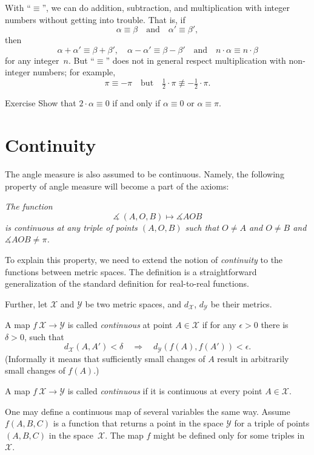 With ``$\equiv$'', we can do addition, subtraction, and multiplication with integer numbers without getting into trouble.
That is, if
$$\alpha\equiv\beta
\quad
\text{and}
\quad
\alpha'\equiv \beta',$$ 
then
$$\alpha+\alpha'\equiv\beta+\beta',
\quad
\alpha-\alpha'\equiv \beta-\beta'
\quad 
\text{and}
\quad
n\cdot\alpha\equiv n\cdot\beta$$
for any integer~$n$.
But ``$\equiv$'' does not in general respect multiplication with non-integer numbers; for example, 
$$\pi
\equiv 
-\pi
\quad
\text{but}
\quad
\tfrac12\cdot\pi
\not\equiv
-\tfrac12\cdot\pi.$$ 

\begin{thm}{Exercise}\label{ex:2a=0}
Show that $2\cdot\alpha\equiv0$ if and only if $\alpha\equiv0$ or $\alpha\equiv\pi$.
\end{thm}

\section*{Continuity}

The angle measure is also assumed to be continuous.
Namely, the following property of angle measure will become a part of the axioms:

\textit{The function}
$$\measuredangle\:(A,O,B)\mapsto\measuredangle A O B$$
\textit{is continuous at any triple of points $(A,O,B)$
such that $O\ne A$ and $O\ne B$ and $\measuredangle A O B\ne\pi$.}

To explain this property, we need to extend the notion of {}\emph{continuity} to the functions between metric spaces.
The definition is a straightforward generalization of the standard definition for real-to-real functions.

Further, let $\mathcal X$ and $\mathcal Y$ be two metric spaces,
and $d_{\mathcal X}$, $d_{\mathcal Y}$ be their metrics.

A map $f\:\mathcal X\to\mathcal Y$ is called \emph{continuous} at point $A\in \mathcal X$
if for any $\epsilon>0$ there is $\delta>0$, such that 
\[d_{\mathcal X}(A,A')
<
\delta
\quad
\Rightarrow
\quad
d_{\mathcal Y}(f(A),f(A'))
<
\epsilon.\]
(Informally it means that sufficiently small changes of $A$ result in arbitrarily small changes of $f(A)$.)

A map $f\:\mathcal X\to\mathcal Y$ is called \emph{continuous} if it is continuous at every point $A\in \mathcal X$.

One may define a continuous map of several variables the same way.
Assume $f(A,B,C)$ is a function that returns a point in the space $\mathcal Y$ for a triple of points $(A,B,C)$
in the space~$\mathcal X$.
The map $f$ might be defined only for some triples in~$\mathcal X$.

